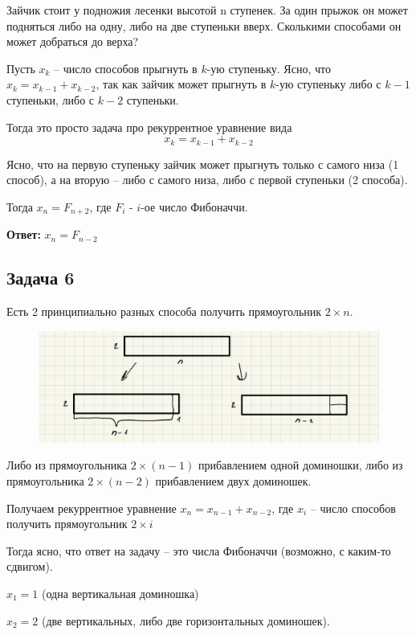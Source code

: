 Зайчик стоит у подножия лесенки высотой n ступенек. За один прыжок он может подняться либо на одну, либо на две ступеньки вверх. Сколькими способами он может
добраться до верха?

Пусть $x_k$ -- число способов прыгнуть в $k$-ую ступеньку. Ясно, что $x_k = x_{k-1} + x_{k-2}$, так как зайчик может прыгнуть в $k$-ую ступеньку либо с $k-1$ ступеньки, либо с $k - 2$ ступеньки.

Тогда это просто задача про рекуррентное уравнение вида 
\[
x_k = x_{k-1} + x_{k-2}
\]

Ясно, что на первую ступеньку зайчик может прыгнуть только с самого низа (1 способ), а на вторую -- либо с самого низа, либо с первой ступеньки (2 способа).

Тогда $x_n = F_{n+2}$, где $F_{i}$ - $i$-ое число Фибоначчи.

\textbf{Ответ:} $x_n = F_{n-2}$

\subsection{Задача 6}

Есть 2 принципиально разных способа получить прямоугольник $2 \times n$.

\begin{figure}[H]
    \centering
    \includegraphics[width=1\linewidth]{Figures/sem06_task6.png}
\end{figure}

Либо из прямоугольника $2 \times (n-1)$ прибавлением одной доминошки, либо из прямоугольника $2 \times (n -2)$ прибавлением двух доминошек.

Получаем рекуррентное уравнение $x_n = x_{n-1} + x_{n-2}$, где $x_i$ -- число способов получить прямоугольник $2 \times i$

Тогда ясно, что ответ на задачу -- это числа Фибоначчи (возможно, с каким-то сдвигом).

$x_1 = 1$ (одна вертикальная доминошка)

$x_2 = 2$ (две вертикальных, либо две горизонтальных доминошек).

